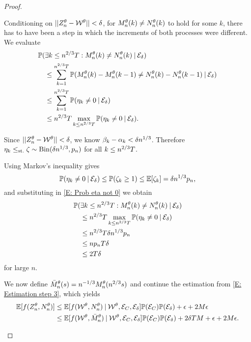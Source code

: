 \begin{proof}
\begin{proofpart}
Conditioning on $||Z_n^{\theta} - \mathcal{W}^{\theta}|| < \delta$, for $M_n^{\theta}(k) \neq N_n^{\theta}(k)$ to hold for some $k$,
there has to have been a step in which the increments of both processes were different.
We evaluate
\begin{equation} \label{E: Prob eta not 0}
\begin{aligned}
&\mathbb{P}(\exists k\leq n^{2 / 3}T: M_n^{\theta}(k) \neq N_n^{\theta}(k) \: | \: \mathcal{E}_{\delta}) \\
&\quad \leq \sum_{k=1}^{n^{2 / 3}T} \mathbb{P}( M_n^{\theta}(k) - M_n^{\theta}(k-1) \neq N_n^{\theta}(k) - N_n^{\theta}(k-1) \: | \: \mathcal{E}_{\delta}) \\
&\quad \leq \sum_{k=1}^{n^{2 / 3}T} \mathbb{P}( \eta_k \neq 0 \: | \: \mathcal{E}_{\delta}) \\
&\quad \leq n^{2 / 3}T \max_{k \leq n^{2 / 3}T} \mathbb{P}(\eta_k \neq 0 \: | \: \mathcal{E}_{\delta}).
\end{aligned}
\end{equation}

Since $||Z_n^{\theta} - \mathcal{W}^{\theta}|| < \delta$, we know $\beta_k - \alpha_k < \delta n^{1 / 3}$. Therefore
$\eta_k \leq_{\text{st.}} \zeta \sim \operatorname*{Bin}(\delta n^{1 / 3}, p_n)$ for all $k \leq n^{2 / 3}T$.

Using Markov's inequality gives
\begin{equation}
\mathbb{P}( \eta_k \neq 0 \: | \: \mathcal{E}_{\delta} ) \leq \mathbb{P}( \zeta_k \geq 1 ) \leq \mathbb{E}[\zeta_k] = \delta n^{1 / 3}p_n,
\end{equation}
and substituting in \eqref{E: Prob eta not 0} we obtain
\begin{equation}
\begin{aligned}
&\mathbb{P}(\exists k\leq n^{2 / 3}T: M_n^{\theta}(k) \neq N_n^{\theta}(k) \: | \: \mathcal{E}_{\delta}) \\
&\quad \leq n^{2 / 3}T \max_{k \leq n^{2 / 3}T} \mathbb{P}( \eta_k \neq 0 \: | \: \mathcal{E}_{\delta} ) \\
&\quad \leq n^{2 / 3}T\delta n^{1 / 3}p_n \\
&\quad \leq n p_n T \delta \\
&\quad \leq 2T\delta 
\end{aligned}
\end{equation}
for large $n$.

We now define $\bar{M}_n^{\theta}(s) = n^{-1 / 3} M_n^{\theta}(n^{2 / 3}s)$ and continue the estimation from \eqref{E: Estimation step 3},
which yields
\begin{equation} \label{E: Estimation step 4}
\begin{aligned}
\mathbb{E}[f(Z_n^{\theta}, N_n^{\theta})] 
&\leq \mathbb{E}[f(\mathcal{W}^{\theta}, N_n^{\theta}) \: | \: \mathcal{W}^{\theta}, \mathcal{E}_{C}, \mathcal{E}_{\delta}]\mathbb{P}(\mathcal{E}_{C})\mathbb{P}(\mathcal{E}_{\delta}) + \epsilon + 2M\epsilon   \\
&\leq \mathbb{E}[f(\mathcal{W}^{\theta}, \bar{M}_n^{\theta}) \: | \: \mathcal{W}^{\theta}, \mathcal{E}_{C}, \mathcal{E}_{\delta}]\mathbb{P}(\mathcal{E}_{C})\mathbb{P}(\mathcal{E}_{\delta}) + 2\delta T M + \epsilon  + 2M\epsilon  .
\end{aligned}
\end{equation}


\end{proofpart}
\end{proof}
